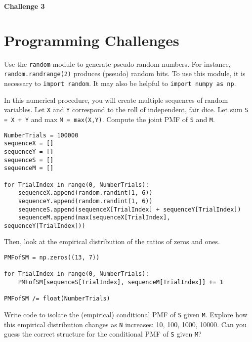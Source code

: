 \documentclass[11pt]{article}
\begin{document}
\begin{center}
{\bfseries \LARGE Challenge 3}
\end{center}

\section*{Programming Challenges}

Use the \texttt{random} module to generate pseudo random numbers.
For instance, \texttt{random.randrange(2)} produces (pseudo) random bits.
To use this module, it is necessary to \texttt{import random}.
It may also be helpful to \texttt{import numpy as np}.

In this numerical procedure, you will create multiple sequences of random variables.
Let \texttt{X} and \texttt{Y} correspond to the roll of independent, fair dice.
Let sum \texttt{S = X + Y} and max \texttt{M = max(X,Y)}.
Compute the joint PMF of \texttt{S} and \texttt{M}.
\begin{verbatim}
NumberTrials = 100000
sequenceX = []
sequenceY = []
sequenceS = []
sequenceM = []

for TrialIndex in range(0, NumberTrials):
    sequenceX.append(random.randint(1, 6))
    sequenceY.append(random.randint(1, 6))
    sequenceS.append(sequenceX[TrialIndex] + sequenceY[TrialIndex])
    sequenceM.append(max(sequenceX[TrialIndex], sequenceY[TrialIndex]))
\end{verbatim}
Then, look at the empirical distribution of the ratios of zeros and ones.
\begin{verbatim}
PMFofSM = np.zeros((13, 7))

for TrialIndex in range(0, NumberTrials):
    PMFofSM[sequenceS[TrialIndex], sequenceM[TrialIndex]] += 1

PMFofSM /= float(NumberTrials)
\end{verbatim}
Write code to isolate the (empirical) conditional PMF of \texttt{S} given \texttt{M}.
Explore how this empirical distribution changes as \texttt{N} increases: 10, 100, 1000, 10000.
Can you guess the correct structure for the conditional PMF of \texttt{S} given \texttt{M}?
\end{document}
